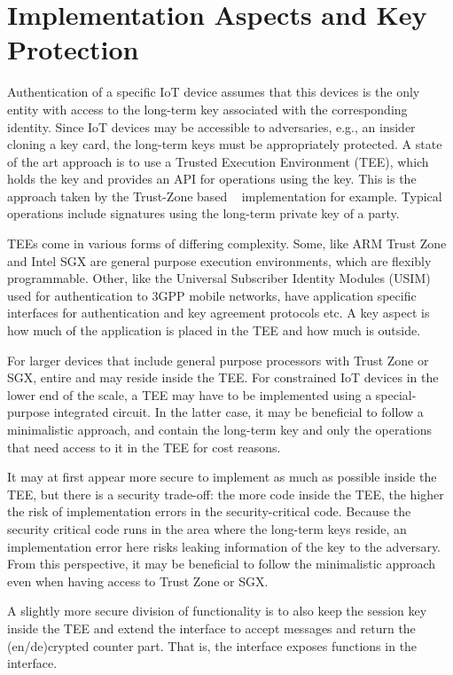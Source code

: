 \section{Implementation Aspects and Key Protection}
\label{sec:TEE}
Authentication of a specific IoT device assumes that this devices is the only
entity with access to the long-term key associated with the corresponding
identity.
%
Since IoT devices may be accessible to adversaries, e.g., an insider cloning a
key card, the long-term keys must be appropriately protected.
%
A state of the art approach is to use a Trusted Execution Environment (TEE),
which holds the key and provides an API for operations using the key.
%
This is the approach taken by the
Trust-Zone based \mMuEdhoc{}~\cite{DBLP:conf/codaspy/Hristozov0XFLS21}
implementation for example.
%
Typical operations include signatures using the long-term private key of a
party.
%

TEEs come in various forms of differing complexity.
%
Some, like ARM Trust Zone and Intel SGX are general purpose execution
environments, which are flexibly programmable.
%
Other, like the Universal Subscriber Identity Modules (USIM) used for
authentication to 3GPP mobile networks, have application specific interfaces 
for
authentication and key agreement protocols etc.
%
A key aspect is how much of the application is placed in the TEE and how 
much is
outside.
%

For larger devices that include general purpose processors with Trust Zone or
SGX, entire \mEdhoc{} and \mOscore{} may reside inside the TEE.
%
For constrained IoT devices in the lower end of the scale, a TEE may have to be
implemented using a special-purpose integrated circuit.
%
In the latter case, it may be beneficial to follow a minimalistic approach, and
contain the long-term key and only
the operations that need access to it in the TEE for cost reasons.
%

It may at first appear more secure to implement as much as possible inside the
TEE, but there is a security trade-off: the more code inside the TEE,
the higher the risk of implementation errors in the security-critical code.
%
Because the security critical code runs in the area where the long-term keys
reside, an implementation error here risks leaking information of the key to 
the
adversary.
%
From this perspective, it may be beneficial to follow the minimalistic approach
even when having access to Trust Zone or SGX.
%

A slightly more secure division of functionality is to also keep the
session key inside
the TEE and extend the interface to accept messages and return the
(en/de)crypted counter part.
%
That is, the interface exposes \mAead{} functions in the interface.
%

